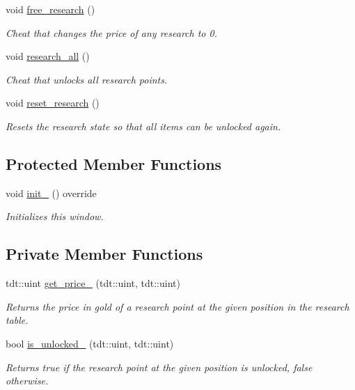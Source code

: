 \begin{DoxyCompactItemize}
void \hyperlink{class_research_window_afaa2f334ffaaa466661132787b6cf73d}{free\+\_\+research} ()
\begin{DoxyCompactList}\small\item\em Cheat that changes the price of any research to 0. \end{DoxyCompactList}\item 
void \hyperlink{class_research_window_ad7550456fcac7b8eddadd9070161e755}{research\+\_\+all} ()
\begin{DoxyCompactList}\small\item\em Cheat that unlocks all research points. \end{DoxyCompactList}\item 
void \hyperlink{class_research_window_a47234d07778e8f3a29b0be59ce6c275f}{reset\+\_\+research} ()
\begin{DoxyCompactList}\small\item\em Resets the research state so that all items can be unlocked again. \end{DoxyCompactList}\end{DoxyCompactItemize}
\subsection*{Protected Member Functions}
\begin{DoxyCompactItemize}
\item 
void \hyperlink{class_research_window_ac47f66b9c25ddf9076c68196296120f9}{init\+\_\+} () override
\begin{DoxyCompactList}\small\item\em Initializes this window. \end{DoxyCompactList}\end{DoxyCompactItemize}
\subsection*{Private Member Functions}
\begin{DoxyCompactItemize}
\item 
tdt\+::uint \hyperlink{class_research_window_a938072590a252d02391883d7cdc9236b}{get\+\_\+price\+\_\+} (tdt\+::uint, tdt\+::uint)
\begin{DoxyCompactList}\small\item\em Returns the price in gold of a research point at the given position in the research table. \end{DoxyCompactList}\item 
bool \hyperlink{class_research_window_a016e751972256ac1832bed5c4cdabc75}{is\+\_\+unlocked\+\_\+} (tdt\+::uint, tdt\+::uint)
\begin{DoxyCompactList}\small\item\em Returns true if the research point at the given position is unlocked, false otherwise. \end{DoxyCompactList}\end{DoxyCompactItemize}
